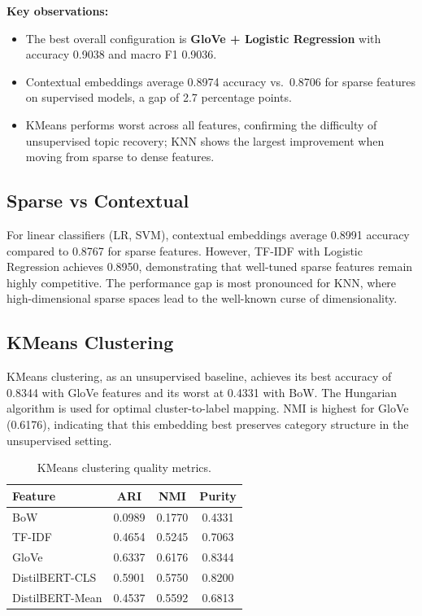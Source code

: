 \documentclass[11pt, a4paper, twocolumn]{article}
\begin{document}
\textbf{Key observations:}
\begin{itemize}[leftmargin=*,topsep=2pt,itemsep=1pt]
    \item The best overall configuration is \textbf{GloVe + Logistic Regression} with accuracy 0.9038 and macro F1 0.9036.
    \item Contextual embeddings average 0.8974 accuracy vs.\ 0.8706 for sparse features on supervised models, a gap of 2.7 percentage points.
    \item KMeans performs worst across all features, confirming the difficulty of unsupervised topic recovery; KNN shows the largest improvement when moving from sparse to dense features.
\end{itemize}

\subsection{Sparse vs Contextual}
For linear classifiers (LR, SVM), contextual embeddings average 0.8991 accuracy compared to 0.8767 for sparse features. However, TF-IDF with Logistic Regression achieves 0.8950, demonstrating that well-tuned sparse features remain highly competitive. The performance gap is most pronounced for KNN, where high-dimensional sparse spaces lead to the well-known curse of dimensionality.

\subsection{KMeans Clustering}
KMeans clustering, as an unsupervised baseline, achieves its best accuracy of 0.8344 with GloVe features and its worst at 0.4331 with BoW. The Hungarian algorithm is used for optimal cluster-to-label mapping. NMI is highest for GloVe (0.6176), indicating that this embedding best preserves category structure in the unsupervised setting.

\begin{table}[H]
\centering
\caption{KMeans clustering quality metrics.}
\label{tab:kmeans}
\small
\begin{tabular}{l ccc}
\toprule
\textbf{Feature} & \textbf{ARI} & \textbf{NMI} & \textbf{Purity} \\
\midrule
  BoW & 0.0989 & 0.1770 & 0.4331 \\
  TF-IDF & 0.4654 & 0.5245 & 0.7063 \\
  GloVe & 0.6337 & 0.6176 & 0.8344 \\
  DistilBERT-CLS & 0.5901 & 0.5750 & 0.8200 \\
  DistilBERT-Mean & 0.4537 & 0.5592 & 0.6813 \\
\bottomrule
\end{tabular}
\end{table}
\end{document}
